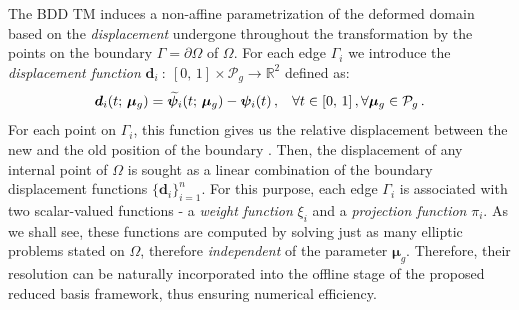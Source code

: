 \documentclass[12pt, a4paper, twoside, openright, notitlepage]{report}
\numberwithin{equation}{chapter}
\theoremstyle{theorem}
\theoremstyle{definition}
\theoremstyle{remark}
\theoremstyle{proposition}
\numberwithin{figure}{chapter}
\newcommand{\wt}[1]{\widetilde{#1}}
\newcommand{\bg}[1]{\boldsymbol{#1}}
\begin{document}
		The BDD TM induces a non-affine parametrization of the deformed domain based on the \emph{displacement} undergone throughout the transformation by the points on the boundary $\Gamma = \partial \Omega$ of $\Omega$. For each edge $\Gamma_i$ we introduce the \emph{displacement function} $\bg{d}_i ~ : ~ [0, \, 1] \times \mathcal{P}_g \rightarrow \mathbb{R}^2$ defined as:
		\begin{equation*}
			\bg{d}_i(t; \, \bg{\mu}_g) = \wt{\bg{\psi}}_i(t; \, \bg{\mu}_g) - \bg{\psi}_i(t) \, , \hspace*{0.3cm} \forall t \in [0, \, 1] \, , \forall \bg{\mu}_g \in \mathcal{P}_g \, .
		\end{equation*}
		For each point on $\Gamma_i$, this function gives us the relative displacement between the new and the old position of the boundary \cite{JIR14}. Then, the displacement of any internal point of $\Omega$ is sought as a linear combination of the boundary displacement functions $\big\lbrace \bg{d}_i \big\rbrace_{i = 1}^n$. For this purpose, each edge $\Gamma_i$ is associated with two scalar-valued functions - a \emph{weight function} $\xi_i$ and a \emph{projection function} $\pi_i$. As we shall see, these functions are computed by solving just as many elliptic problems stated on $\Omega$, therefore \emph{independent} of the parameter $\bg{\mu}_g$. Therefore, their resolution can be naturally incorporated into the offline stage of the proposed reduced basis framework, thus ensuring numerical efficiency. 
		
\end{document}
